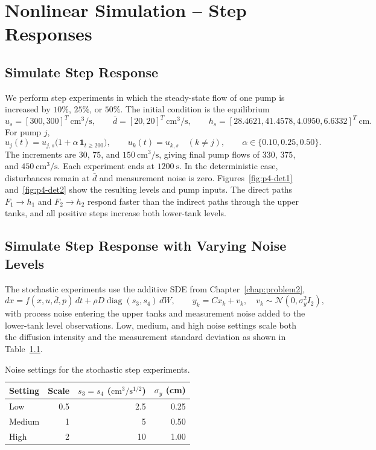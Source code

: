 \chapter{Nonlinear Simulation -- Step Responses}
\label{chap:problem4}

\section{Simulate Step Response}

We perform step experiments in which the steady-state flow of one pump is increased by \(10\%\), \(25\%\), or \(50\%\). The initial condition is the equilibrium
\[
u_s=[300,300]^T\ \mathrm{cm^3/s},\qquad
\bar d=[20,20]^T\ \mathrm{cm^3/s},\qquad
h_s=[28.4621,41.4578,4.0950,6.6332]^T\ \mathrm{cm}.
\]
For pump \(j\),
\[
u_j(t)=u_{j,s}\bigl(1+\alpha\,\mathbf 1_{t\ge 200}\bigr),\qquad
u_k(t)=u_{k,s}\quad(k\ne j),\qquad
\alpha\in\{0.10,0.25,0.50\}.
\]
The increments are \(30\), \(75\), and \(150\ \mathrm{cm^3/s}\), giving final pump flows of \(330\), \(375\), and \(450\ \mathrm{cm^3/s}\). Each experiment ends at \(1200\ \mathrm{s}\). In the deterministic case, disturbances remain at \(\bar d\) and measurement noise is zero. Figures~\ref{fig:p4-det1} and~\ref{fig:p4-det2} show the resulting levels and pump inputs. The direct paths \(F_1\to h_1\) and \(F_2\to h_2\) respond faster than the indirect paths through the upper tanks, and all positive steps increase both lower-tank levels.

\section{Simulate Step Response with Varying Noise Levels}

The stochastic experiments use the additive SDE from Chapter~\ref{chap:problem2},
\[
dx=f(x,u,\bar d,p)\,dt+\rho D\operatorname{diag}(s_3,s_4)\,dW,
\qquad
y_k=Cx_k+v_k,\quad v_k\sim\mathcal N(0,\sigma_y^2 I_2),
\]
with process noise entering the upper tanks and measurement noise added to the lower-tank level observations. Low, medium, and high noise settings scale both the diffusion intensity and the measurement standard deviation as shown in Table~\ref{tab:p4-noise}.

\begin{table}[htbp]
 \centering
 \caption{Noise settings for the stochastic step experiments.}
 \label{tab:p4-noise}
 \begin{tabular}{lrrr}
 \hline
 Setting & Scale & $s_3=s_4$ ($\mathrm{cm^3/s^{1/2}}$) & $\sigma_y$ (cm)\\
 \hline
 Low & 0.5 & 2.5 & 0.25\\
 Medium & 1 & 5 & 0.50\\
 High & 2 & 10 & 1.00\\
 \hline
 \end{tabular}
\end{table}

